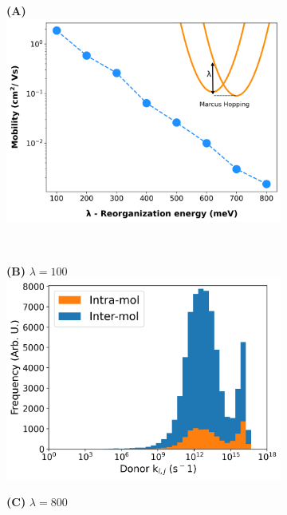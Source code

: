 \begin{figure}[]
\centering
\begin{subfigure}{\textwidth}
    \textbf{(A)} \\
    \centering
    \includegraphics[width=.8\textwidth]{figures/reorg-log-yaxis.png}
    \newline
\end{subfigure}%
\\
\begin{subfigure}{.5\textwidth}
    \textbf{(B)} $\lambda = 100$
    \centering
    \includegraphics[width=\textwidth]{figures/donor_hopping_rate_clusters_reorg100.png}
\end{subfigure}%
\begin{subfigure}{.5\textwidth}
    \textbf{(C)} $\lambda = 800$
    \centering

\end{subfigure}
\end{figure}
